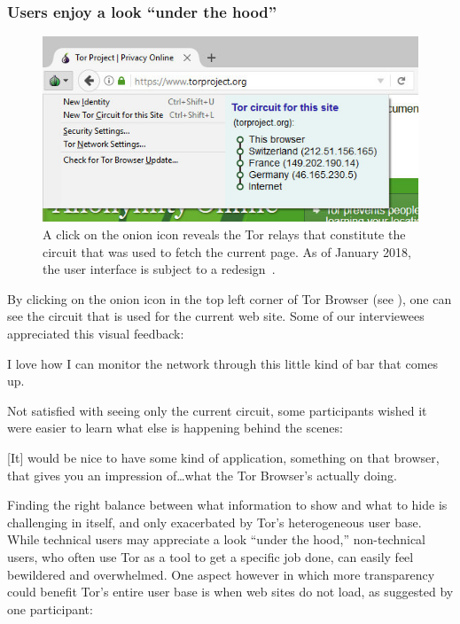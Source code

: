 \subsubsection{Users enjoy a look ``under the hood''}
\label{sec:under-the-hood}

\begin{figure}[t]
    \centering
    \includegraphics[width=\linewidth]{figures/tor-button-screenshot.jpg}
    \caption{A click on the onion icon reveals the Tor relays that constitute
    the circuit that was used to fetch the current page.  As of January 2018,
    the user interface is subject to a redesign~\cite{trac24309}.}
    \label{fig:tor-button}
\end{figure}

By clicking on the onion icon in the top left corner of Tor Browser (see
), one can see the circuit that is used for the current web
site.  Some of our interviewees appreciated this visual feedback:

\begin{displayquote}[P08]
I love how I can monitor the network through this little kind of bar that comes
up.
\end{displayquote}

Not satisfied with seeing only the current circuit, some participants wished it
were easier to learn what else is happening behind the scenes:

\begin{displayquote}[P02]
{[It]} would be nice to have some kind of application, something on that browser,
that gives you an impression of\dots what the Tor Browser's actually doing.
\end{displayquote}

Finding the right balance between what information to show and what to hide is
challenging in itself, and only exacerbated by Tor's heterogeneous user base.
While technical users may appreciate a look ``under the hood,'' non-technical
users, who often use Tor as a tool to get a specific job done, can easily feel
bewildered and overwhelmed.  One aspect however in which more transparency could
benefit Tor's entire user base is when web sites do not load, as suggested by
one participant:

